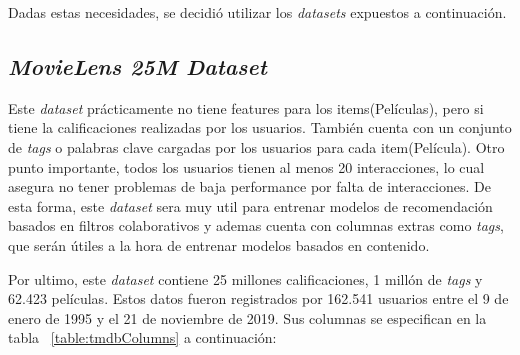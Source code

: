 \documentclass[11pt,a4paper,twoside]{thesis}
\begin{document}
Dadas estas necesidades, se decidió utilizar los \textit{datasets} expuestos a
continuación.

\subsection{\textit{MovieLens 25M Dataset}}

Este \textit{dataset} \cite{movielens} prácticamente no tiene features para los
items(Películas), pero si tiene la calificaciones realizadas por los usuarios.
También cuenta con un conjunto de \textit{tags} o palabras clave cargadas por
los usuarios para cada item(Película). Otro punto importante, todos los
usuarios tienen al menos 20 interacciones, lo cual asegura no tener problemas
de baja performance por falta de interacciones. De esta forma, este
\textit{dataset} sera muy util para entrenar modelos de recomendación basados
en filtros colaborativos y ademas cuenta con columnas extras como
\textit{tags}, que serán útiles a la hora de entrenar modelos basados en
contenido.

Por ultimo, este \textit{dataset} contiene 25 millones calificaciones, 1 millón
de \textit{tags} y 62.423 películas. Estos datos fueron registrados por 162.541
usuarios entre el 9 de enero de 1995 y el 21 de noviembre de 2019. Sus columnas
se especifican en la tabla ~\ref{table:tmdbColumns} a continuación:
\end{document}
